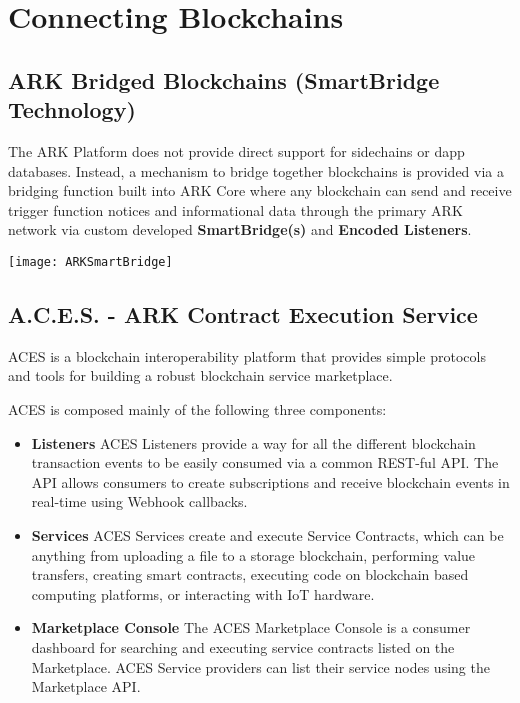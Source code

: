 \documentclass[11pt,fleqn,oneside]{book} %
\begin{document}
\section{Connecting Blockchains}
\subsection{ARK Bridged Blockchains (SmartBridge Technology)}
The ARK Platform does not provide direct support for sidechains or dapp databases.
Instead, a mechanism to bridge together blockchains is provided via a bridging
function built into ARK Core where any blockchain can send and receive trigger
function notices and informational data through the primary ARK network via
custom developed \textbf{SmartBridge(s)} and \textbf{Encoded Listeners}.
\begin{center}
	\texttt{[image: ARKSmartBridge]}
\end{center}

\subsection{A.C.E.S. - ARK Contract Execution Service}
ACES is a blockchain interoperability platform that provides simple protocols and tools for building a robust blockchain 
service marketplace.

ACES is composed mainly of the following three components:
\begin{itemize}
	\item \textbf{Listeners} ACES Listeners provide a way for all the different blockchain transaction events to be easily 
	consumed via a common REST-ful API. The API allows consumers to create subscriptions and receive blockchain events 
	in real-time using Webhook callbacks.
	\item \textbf{Services} ACES Services create and execute Service Contracts, which can be anything from uploading 
	a file to a storage blockchain, performing value transfers, creating smart contracts, executing code on 
	blockchain based computing platforms, or interacting with IoT hardware.
	\item \textbf{Marketplace Console} The ACES Marketplace Console is a consumer dashboard for searching and executing 
	service contracts listed on the Marketplace. ACES Service providers can list their service nodes using the Marketplace API.
\end{itemize}
\end{document}
